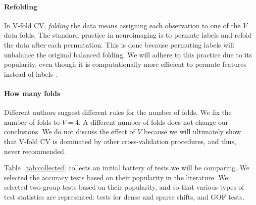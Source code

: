\documentclass[oupdraft]{bio}
\begin{document}
\paragraph{Refolding}
In V-fold CV, \emph{folding} the data means assigning each observation to one of the $V$ data folds. 
The standard practice in neuroimaging is to permute labels and refold the data after each permutation. 
This is done because permuting labels will unbalance the original balanced folding.
We will adhere to this practice due to its popularity, even though it is computationally more efficient to permute features instead of labels \citep[e.g.][]{golland_permutation_2005} .


\paragraph{How many folds}
Different authors suggest different rules for the number of folds. 
We fix the number of folds to $V=4$.
A different number of folds does not change our conclusions. 
We do not discuss the effect of $V$ because we will ultimately show that V-fold CV is dominated by other cross-validation procedures, and thus, never recommended. 

\bigskip

Table~\ref{tab:collected} collects an initial battery of tests we will be comparing. 
We selected the accuracy tests based on their popularity in the literature.
We selected two-group tests based on their popularity, and so that various types of test statistics are represented: tests for dense and sparse shifts, and GOF tests. 
\end{document}
